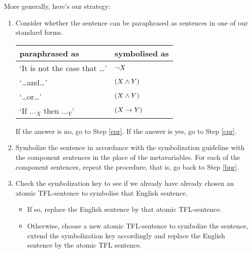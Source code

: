 More generally, here's our strategy:
\begin{highlighted}
	\begin{enumerate}
		\item\label{bpr} Consider whether the sentence can be paraphrased as sentences in one of our standard forms. 
			\begin{center}
			\begin{tabular}{l l}
				\textbf{paraphrased as} & \textbf{symbolised as}\\[.2em]
				\hline
				`It is not the case that \ldots' & $\neg X$\\
				`\ldots and\ldots' & $(X\mathbin{\wedge}Y)$\\
				`\ldots or\ldots' & $(X\mathbin{\wedge}Y)$\\
				`If $\ldots_X$ then $\ldots_Y$' & $(X\rightarrow Y)$
			\end{tabular}
		\end{center} 
		If the answer is no, go to Step \ref{epr}. If the answer is yes, go to Step \ref{cpr}.
		\item\label{cpr} Symbolize the sentence in accordance with the symbolization guideline with the component sentences in the place of the metavariables. For each of the component sentences, repeat the procedure, that is, go back to Step \ref{bpr}.
		\item\label{epr} Check the symbolization key to see if we already have already chosen an atomic TFL-sentence to symbolise that English sentence. 
			\begin{itemize}
				\item If so, replace the English sentence by that atomic TFL-sentence.
				\item Otherwise, choose a new atomic TFL-sentence to symbolize the sentence, extend the symbolization key accordingly and replace the English sentence by the atomic TFL sentence.
			\end{itemize}
	\end{enumerate}
\end{highlighted}

